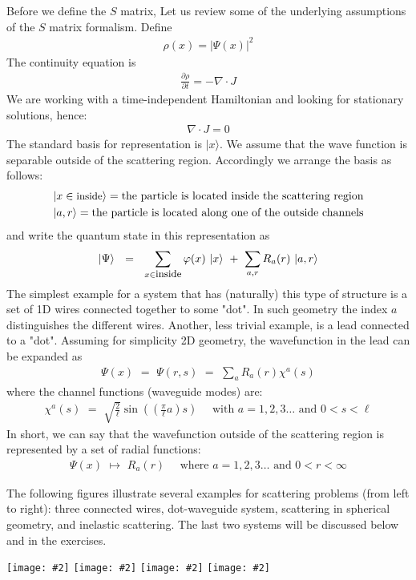 \documentclass[onecolumn,fleqn, 11pt]{revtex4}
\newcommand{\putgraph}[2][0.30\hsize]{\texttt{[image: \#2]}}
\newcommand{\beq}{\begin{eqnarray}}
\newcommand{\eeq}{\end{eqnarray}}
\begin{document}
Before we define the $S$ matrix, Let us review 
some of the underlying assumptions of the $S$ matrix 
formalism. Define 
\beq
\rho(x) = {| \Psi (x)| }^{2} 
\eeq
The continuity equation is
\beq
\frac{\partial\rho}{\partial{t}} = -{\nabla\cdot{J}} 
\eeq
We are working with a time-independent Hamiltonian 
and looking for stationary solutions, hence: 
\beq
\nabla\cdot{J}=0 
\eeq
The standard basis for representation is ${|x\rangle}$. 
We assume that the wave function is separable outside 
of the scattering region. Accordingly we arrange the basis as follows:
\beq
|x \in \mbox{\small inside} \rangle = \mbox{the particle is located inside the scattering region}
\\ \nonumber
|a,r\rangle = \mbox{the particle is located along one of the outside channels}
\eeq
and write the quantum state in this representation as 
\beq
|\Psi\rangle \ \ = \ \ 
\sum_{x \in \mbox{\small inside}} \varphi(x) \ |x\rangle
\ + \ \sum_{a,r} R_a(r) \ |a,r\rangle
\eeq
The simplest example for a system that has (naturally) this type 
of structure is a set of 1D wires connected together to some "dot".  
In such geometry the index $a$ distinguishes the different wires. 
Another, less trivial example, is a lead connected to a "dot". 
Assuming for simplicity 2D geometry, the wavefunction 
in the lead can be expanded as 
\beq
\Psi(x) \,\,=\,\, 
\Psi(r,s) \,\,=\,\, \sum_a R_a(r) \chi^a(s) 
\eeq
where the channel functions (waveguide modes) are:
\beq
\chi^a(s) \,\,=\,\,
\sqrt{\frac{2}{\ell}}\sin\left(\left(\frac{\pi}{\ell}a\right)s\right) 
\ \ \ \ \ \ \mbox{with $a=1,2,3 \dots $ and $0<s<\ell$} 
\eeq
In short, we can say that the wavefunction outside 
of the scattering region is represented by a set of radial functions:
\beq
\Psi(x) \,\, \mapsto \,\, R_a(r) 
\ \ \ \ \ \ \mbox{where $a=1,2,3 \dots $ and $0<r<\infty$}
\eeq

The following figures illustrate several examples 
for scattering problems (from left to right): three connected wires, 
dot-waveguide system, scattering in spherical 
geometry, and inelastic scattering. 
The last two systems will be discussed 
below and in the exercises. 


\begin{center}
\putgraph[0.1\hsize]{ThreeWires.jpg} 
\hspace{0.06\hsize}
\putgraph[0.2\hsize]{DotWaveGuide} 
\hspace{0.06\hsize}
\putgraph[0.2\hsize]{ScatteringSphericalGeometry} 
\hspace{0.06\hsize}
\putgraph[0.25\hsize]{InelasticScattering} 
\end{center}
\end{document}
